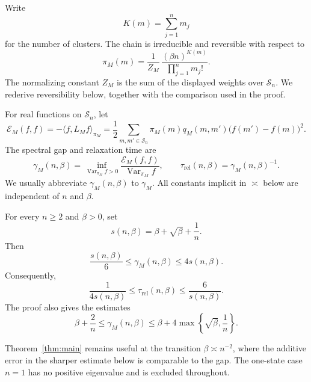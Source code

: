Write
\[
 K(m)=\sum_{j=1}^n m_j
\]
for the number of clusters. The chain is irreducible and reversible with respect to
\begin{equation}\label{eq:polymer-stationary-intro}
 \pi_M(m)=\frac1{Z_M}\,
                 \frac{(\beta n)^{K(m)}}{\prod_{j=1}^n m_j!}.
\end{equation}
The normalizing constant $Z_M$ is the sum of the displayed weights over $\mathcal S_n$. We rederive reversibility below, together with the comparison used in the proof.

For real functions on $\mathcal S_n$, let
\begin{equation}\label{eq:dirichlet-intro}
 \mathcal E_M(f,f)
 =-\langle f,L_Mf\rangle_{\pi_M}
 =\frac12\sum_{m,m'\in\mathcal S_n}
       \pi_M(m)q_M(m,m')\bigl(f(m')-f(m)\bigr)^2.
\end{equation}
The spectral gap and relaxation time are
\begin{equation}\label{eq:gap-intro}
 \gamma_M(n,\beta)=
  \inf_{\operatorname{Var}_{\pi_M}f>0}
       \frac{\mathcal E_M(f,f)}{\operatorname{Var}_{\pi_M}f},
 \qquad
 \tau_{\mathrm{rel}}(n,\beta)=\gamma_M(n,\beta)^{-1}.
\end{equation}
We usually abbreviate $\gamma_M(n,\beta)$ to $\gamma_M$. All constants implicit in $\asymp$ below are independent of $n$ and $\beta$.

\begin{theorem}\label{thm:main}
For every $n\ge2$ and $\beta>0$, set
\[
 s(n,\beta)=\beta+\sqrt\beta+\frac1n.
\]
Then
\begin{equation}\label{eq:main-gap}
 \frac{s(n,\beta)}6\le\gamma_M(n,\beta)\le4s(n,\beta).
\end{equation}
Consequently,
\begin{equation}\label{eq:main-relaxation}
 \frac1{4s(n,\beta)}\le\tau_{\mathrm{rel}}(n,\beta)
                         \le\frac6{s(n,\beta)}.
\end{equation}
The proof also gives the estimates
\begin{equation}\label{eq:sharper-elementary}
 \beta+\frac2n\le\gamma_M(n,\beta)
       \le\beta+4\max\!\left\{\sqrt\beta,\frac1n\right\}.
\end{equation}
\end{theorem}

Theorem~\ref{thm:main} remains useful at the transition
$\beta\asymp n^{-2}$, where the additive error in the sharper estimate
below is comparable to the gap. The one-state case $n=1$ has no
positive eigenvalue and is excluded throughout.

